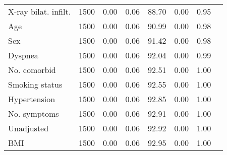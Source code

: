 \documentclass{article}
\begin{document}
{\begin{longtable}{lccccccc}
X-ray bilat. infilt. & 1500 & 0.00 & 0.06 &  88.70 &  0.00 & 0.95 \\ 
Age & 1500 & 0.00 & 0.06 &  90.99 &  0.00 & 0.98 \\ 
Sex & 1500 & 0.00 & 0.06 &  91.42 &  0.00 & 0.98 \\ 
Dyspnea & 1500 & 0.00 & 0.06 &  92.04 &  0.00 & 0.99 \\ 
No. comorbid & 1500 & 0.00 & 0.06 &  92.51 &  0.00 & 1.00 \\ 
Smoking status & 1500 & 0.00 & 0.06 &  92.55 &  0.00 & 1.00 \\ 
Hypertension & 1500 & 0.00 & 0.06 &  92.85 &  0.00 & 1.00 \\ 
No. symptoms & 1500 & 0.00 & 0.06 &  92.91 &  0.00 & 1.00 \\ 
Unadjusted & 1500 & 0.00 & 0.06 &  92.92 &  0.00 & 1.00 \\ 
BMI & 1500 & 0.00 & 0.06 &  92.95 &  0.00 & 1.00 \\
\bottomrule
\hline
\end{longtable}
}

\clearpage
\end{document}
